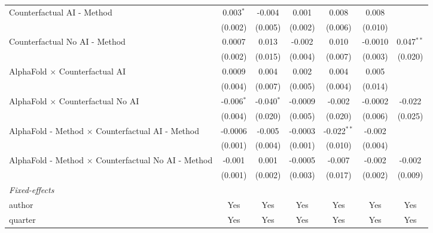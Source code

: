 \begin{tabular}{lcccccc}
   Counterfactual AI - Method                                 & 0.003$^{*}$  & -0.004       & 0.001   & 0.008         & 0.008   &   \\   
                                                              & (0.002)      & (0.005)      & (0.002) & (0.006)       & (0.010) &   \\   
   Counterfactual No AI - Method                              & 0.0007       & 0.013        & -0.002  & 0.010         & -0.0010 & 0.047$^{**}$\\   
                                                              & (0.002)      & (0.015)      & (0.004) & (0.007)       & (0.003) & (0.020)\\   
   AlphaFold $\times$ Counterfactual AI                       & 0.0009       & 0.004        & 0.002   & 0.004         & 0.005   &   \\   
                                                              & (0.004)      & (0.007)      & (0.005) & (0.004)       & (0.014) &   \\   
   AlphaFold $\times$ Counterfactual No AI                    & -0.006$^{*}$ & -0.040$^{*}$ & -0.0009 & -0.002        & -0.0002 & -0.022\\   
                                                              & (0.004)      & (0.020)      & (0.005) & (0.020)       & (0.006) & (0.025)\\   
   AlphaFold - Method $\times$ Counterfactual AI - Method     & -0.0006      & -0.005       & -0.0003 & -0.022$^{**}$ & -0.002  &   \\   
                                                              & (0.001)      & (0.004)      & (0.001) & (0.010)       & (0.004) &   \\   
   AlphaFold - Method $\times$ Counterfactual No AI - Method  & -0.001       & 0.001        & -0.0005 & -0.007        & -0.002  & -0.002\\   
                                                              & (0.001)      & (0.002)      & (0.003) & (0.017)       & (0.002) & (0.009)\\   
   \midrule
   \emph{Fixed-effects}\\
   author                                                     & Yes          & Yes          & Yes     & Yes           & Yes     & Yes\\  
   quarter                                                    & Yes          & Yes          & Yes     & Yes           & Yes     & Yes\\  

\end{tabular}
